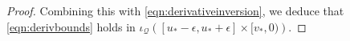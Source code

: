 \documentclass{article}
\newcommand{\Q}{\mathcal{Q}}
\begin{document}
\begin{proof}
Combining this with \eqref{eqn:derivativeinversion}, we deduce that \eqref{eqn:derivbounds} holds in $\iota_\Q\left([u_*-\epsilon,u_*+\epsilon]\times[v_*,0)\right)$.


\end{proof}
\end{document}
